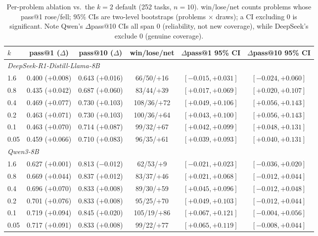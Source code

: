 \documentclass[11pt]{article}                       %
\begin{document}
\begin{table}[H]\centering\small
\caption{Per-problem ablation vs.\ the $k{=}2$ default (252 tasks, $n{=}10$). win/lose/net counts
problems whose pass@1 rose/fell; $95\%$ CIs are two-level bootstraps (problems $\times$ draws); a CI
excluding 0 is significant. Note Qwen's $\Delta$pass@10 CIs all span 0 (reliability, not new coverage),
while DeepSeek's exclude 0 (genuine coverage).}
\label{tab:ablation}
\begin{tabular}{lccccc}
\toprule
$k$ & pass@1 ($\Delta$) & pass@10 ($\Delta$) & win/lose/net & $\Delta$pass@1 95\% CI & $\Delta$pass@10 95\% CI \\
\midrule
\multicolumn{6}{l}{\textit{DeepSeek-R1-Distill-Llama-8B}}\\
1.6  & 0.400 ($+$0.008) & 0.643 ($+$0.016) & 66/50/$+$16 & $[-0.015,+0.031]$ & $[-0.024,+0.060]$ \\
0.8  & 0.435 ($+$0.042) & 0.687 ($+$0.060) & 83/44/$+$39 & $[+0.017,+0.069]$ & $[+0.020,+0.107]$ \\
0.4  & 0.469 ($+$0.077) & 0.730 ($+$0.103) & 108/36/$+$72 & $[+0.049,+0.106]$ & $[+0.056,+0.143]$ \\
0.2  & 0.463 ($+$0.071) & 0.730 ($+$0.103) & 100/36/$+$64 & $[+0.043,+0.100]$ & $[+0.056,+0.143]$ \\
0.1  & 0.463 ($+$0.070) & 0.714 ($+$0.087) & 99/32/$+$67 & $[+0.042,+0.099]$ & $[+0.048,+0.131]$ \\
0.05 & 0.459 ($+$0.066) & 0.710 ($+$0.083) & 96/35/$+$61 & $[+0.039,+0.093]$ & $[+0.040,+0.131]$ \\
\midrule
\multicolumn{6}{l}{\textit{Qwen3-8B}}\\
1.6  & 0.627 ($+$0.001) & 0.813 ($-$0.012) & 62/53/$+$9  & $[-0.021,+0.023]$ & $[-0.036,+0.020]$ \\
0.8  & 0.669 ($+$0.044) & 0.837 ($+$0.012) & 83/37/$+$46 & $[+0.021,+0.068]$ & $[-0.012,+0.044]$ \\
0.4  & 0.696 ($+$0.070) & 0.833 ($+$0.008) & 89/30/$+$59 & $[+0.045,+0.096]$ & $[-0.012,+0.048]$ \\
0.2  & 0.701 ($+$0.076) & 0.833 ($+$0.008) & 95/25/$+$70 & $[+0.049,+0.103]$ & $[-0.012,+0.044]$ \\
0.1  & 0.719 ($+$0.094) & 0.845 ($+$0.020) & 105/19/$+$86 & $[+0.067,+0.121]$ & $[-0.004,+0.056]$ \\
0.05 & 0.717 ($+$0.091) & 0.833 ($+$0.008) & 99/22/$+$77 & $[+0.065,+0.119]$ & $[-0.008,+0.044]$ \\
\bottomrule
\end{tabular}
\end{table}
\end{document}
